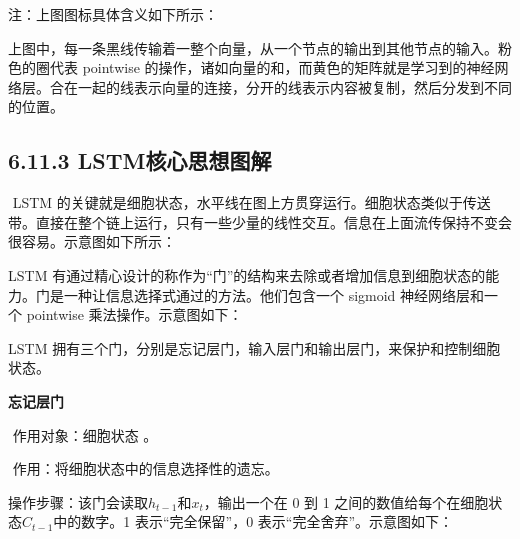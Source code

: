 
注：上图图标具体含义如下所示：


​
上图中，每一条黑线传输着一整个向量，从一个节点的输出到其他节点的输入。粉色的圈代表
pointwise
的操作，诸如向量的和，而黄色的矩阵就是学习到的神经网络层。合在一起的线表示向量的连接，分开的线表示内容被复制，然后分发到不同的位置。

\subsection{6.11.3
LSTM核心思想图解}\label{lstmux6838ux5fc3ux601dux60f3ux56feux89e3}

​ LSTM
的关键就是细胞状态，水平线在图上方贯穿运行。细胞状态类似于传送带。直接在整个链上运行，只有一些少量的线性交互。信息在上面流传保持不变会很容易。示意图如下所示：


LSTM
有通过精心设计的称作为``门''的结构来去除或者增加信息到细胞状态的能力。门是一种让信息选择式通过的方法。他们包含一个
sigmoid 神经网络层和一个 pointwise 乘法操作。示意图如下：


LSTM
拥有三个门，分别是忘记层门，输入层门和输出层门，来保护和控制细胞状态。

\textbf{忘记层门}

​ 作用对象：细胞状态 。

​ 作用：将细胞状态中的信息选择性的遗忘。

​ 操作步骤：该门会读取\(h_{t-1}\)和\(x_t\)，输出一个在 0 到 1
之间的数值给每个在细胞状态\(C_{t-1}​\)中的数字。1 表示``完全保留''，0
表示``完全舍弃''。示意图如下：


